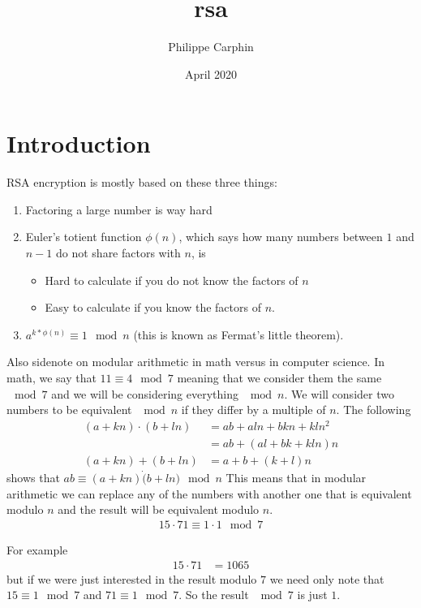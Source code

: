 \documentclass{article}
\title{rsa}
\author{Philippe Carphin}
\date{April 2020}
\begin{document}
\maketitle

\section{Introduction}
RSA encryption is mostly based on these three things:
\begin{enumerate}


\item Factoring a large number is way hard
\item Euler's totient function $\phi(n)$, which says how many numbers between $1$ and $n-1$ do not share factors with $n$, is
\begin{itemize}
    \item Hard to calculate if you do not know the factors of $n$
    \item Easy to calculate if you know the factors of $n$.
\end{itemize}
\item $a^{k*\phi(n)} \equiv 1 \mod{n}$ (this is known as Fermat's little theorem).

\end{enumerate}
Also sidenote on modular arithmetic in math versus in computer science.  In math, we say that $11 \equiv 4 \mod{7}$ meaning that we consider them the same $\mod{7}$ and we will be considering everything $\mod{n}$.  We will consider two numbers to be equivalent $\mod{n}$ if they differ by a multiple of $n$.  The following
\begin{align}
    (a + kn) \cdot (b + ln) &= ab + aln + bkn + kln^2 \\
    &= ab + (al + bk + kln)n \\
    (a + kn) + (b + ln) &= a + b + (k+l)n
\end{align}
shows that $ab \equiv (a+kn)\dot(b+ln) \mod{n}$
This means that in modular arithmetic we can replace any of the numbers with another one that is equivalent modulo $n$ and the result will be equivalent modulo $n$.
\begin{align}
    15 \cdot 71 \equiv 1 \cdot 1 \mod{7}
\end{align}

For example
\begin{align}
    15 \cdot 71 &= 1065
\end{align}
but if we were just interested in the result modulo $7$ we need only note that $15 \equiv 1 \mod{7}$ and $71 \equiv 1 \mod{7}$.  So the result $\mod{7}$ is just $1$.
\end{document}
